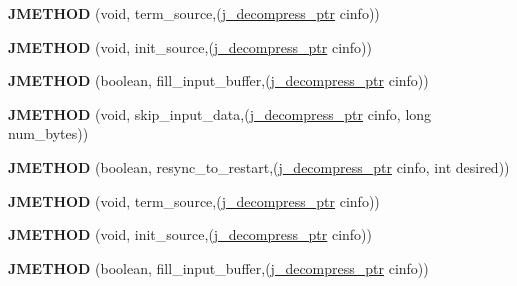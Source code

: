 \begin{DoxyCompactItemize}
{\bfseries J\+M\+E\+T\+H\+OD} (void, term\+\_\+source,(\hyperlink{structjpeg__decompress__struct}{j\+\_\+decompress\+\_\+ptr} cinfo))
\item 
\mbox{\label{structjpeg__source__mgr_af8fda02c19c9dc4e505daabb77c3ad81}} 
{\bfseries J\+M\+E\+T\+H\+OD} (void, init\+\_\+source,(\hyperlink{structjpeg__decompress__struct}{j\+\_\+decompress\+\_\+ptr} cinfo))
\item 
\mbox{\label{structjpeg__source__mgr_ab4a579b1f50108e2de73c7c0c1bbb9fd}} 
{\bfseries J\+M\+E\+T\+H\+OD} (boolean, fill\+\_\+input\+\_\+buffer,(\hyperlink{structjpeg__decompress__struct}{j\+\_\+decompress\+\_\+ptr} cinfo))
\item 
\mbox{\label{structjpeg__source__mgr_a3e29df8ddadb0c15e54b69b5a7a10305}} 
{\bfseries J\+M\+E\+T\+H\+OD} (void, skip\+\_\+input\+\_\+data,(\hyperlink{structjpeg__decompress__struct}{j\+\_\+decompress\+\_\+ptr} cinfo, long num\+\_\+bytes))
\item 
\mbox{\label{structjpeg__source__mgr_a60a35ccd1fb8d954f34c0cdbf29ac010}} 
{\bfseries J\+M\+E\+T\+H\+OD} (boolean, resync\+\_\+to\+\_\+restart,(\hyperlink{structjpeg__decompress__struct}{j\+\_\+decompress\+\_\+ptr} cinfo, int desired))
\item 
\mbox{\label{structjpeg__source__mgr_a6c0683ce1166b9ee659b2d3aa1efb1c2}} 
{\bfseries J\+M\+E\+T\+H\+OD} (void, term\+\_\+source,(\hyperlink{structjpeg__decompress__struct}{j\+\_\+decompress\+\_\+ptr} cinfo))
\item 
\mbox{\label{structjpeg__source__mgr_af8fda02c19c9dc4e505daabb77c3ad81}} 
{\bfseries J\+M\+E\+T\+H\+OD} (void, init\+\_\+source,(\hyperlink{structjpeg__decompress__struct}{j\+\_\+decompress\+\_\+ptr} cinfo))
\item 
\mbox{\label{structjpeg__source__mgr_ab4a579b1f50108e2de73c7c0c1bbb9fd}} 
{\bfseries J\+M\+E\+T\+H\+OD} (boolean, fill\+\_\+input\+\_\+buffer,(\hyperlink{structjpeg__decompress__struct}{j\+\_\+decompress\+\_\+ptr} cinfo))
\item 
\mbox{\label{structjpeg__source__mgr_a3e29df8ddadb0c15e54b69b5a7a10305}} 

\end{DoxyCompactItemize}

